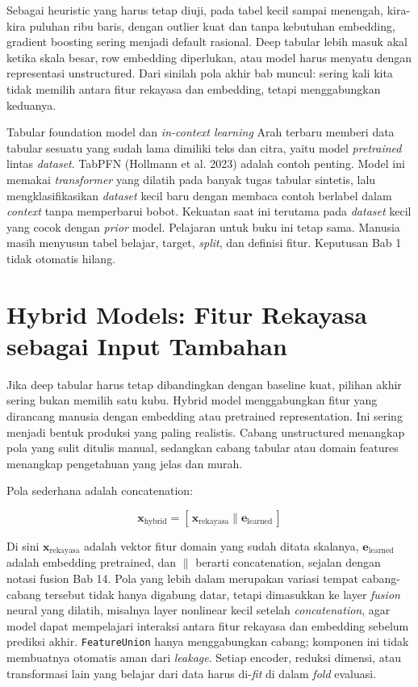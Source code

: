 Sebagai heuristic yang harus tetap diuji, pada tabel kecil sampai menengah, kira-kira puluhan ribu baris, dengan outlier kuat dan tanpa kebutuhan embedding, gradient boosting sering menjadi default rasional. Deep tabular lebih masuk akal ketika skala besar, row embedding diperlukan, atau model harus menyatu dengan representasi unstructured. Dari sinilah pola akhir bab muncul: sering kali kita tidak memilih antara fitur rekayasa dan embedding, tetapi menggabungkan keduanya.

\begin{pendalaman}{Tabular foundation model dan \emph{in-context learning}}
Arah terbaru memberi data tabular sesuatu yang sudah lama dimiliki teks dan citra, yaitu model \emph{pretrained} lintas \emph{dataset}. TabPFN (Hollmann et al. 2023) adalah contoh penting. Model ini memakai \emph{transformer} yang dilatih pada banyak tugas tabular sintetis, lalu mengklasifikasikan \emph{dataset} kecil baru dengan membaca contoh berlabel dalam \emph{context} tanpa memperbarui bobot. Kekuatan saat ini terutama pada \emph{dataset} kecil yang cocok dengan \emph{prior} model. Pelajaran untuk buku ini tetap sama. Manusia masih menyusun tabel belajar, target, \emph{split}, dan definisi fitur. Keputusan Bab 1 tidak otomatis hilang.
\end{pendalaman}

\section{Hybrid Models: Fitur Rekayasa sebagai Input Tambahan}\label{hybrid-models-fitur-rekayasa-sebagai-input-tambahan}

Jika deep tabular harus tetap dibandingkan dengan baseline kuat, pilihan akhir sering bukan memilih satu kubu. Hybrid model menggabungkan fitur yang dirancang manusia dengan embedding atau pretrained representation. Ini sering menjadi bentuk produksi yang paling realistis. Cabang unstructured menangkap pola yang sulit ditulis manual, sedangkan cabang tabular atau domain features menangkap pengetahuan yang jelas dan murah.

Pola sederhana adalah concatenation:

\[
\mathbf{x}_{\text{hybrid}} = [\, \mathbf{x}_{\text{rekayasa}} \parallel \mathbf{e}_{\text{learned}} \,]
\]

Di sini \(\mathbf{x}_{\text{rekayasa}}\) adalah vektor fitur domain yang sudah ditata skalanya, \(\mathbf{e}_{\text{learned}}\) adalah embedding pretrained, dan \(\parallel\) berarti concatenation, sejalan dengan notasi fusion Bab 14. Pola yang lebih dalam merupakan variasi tempat cabang-cabang tersebut tidak hanya digabung datar, tetapi dimasukkan ke layer \emph{fusion} neural yang dilatih, misalnya layer nonlinear kecil setelah \emph{concatenation}, agar model dapat mempelajari interaksi antara fitur rekayasa dan embedding sebelum prediksi akhir. \passthrough{\lstinline!FeatureUnion!} hanya menggabungkan cabang; komponen ini tidak membuatnya otomatis aman dari \emph{leakage}. Setiap encoder, reduksi dimensi, atau transformasi lain yang belajar dari data harus di-\emph{fit} di dalam \emph{fold} evaluasi.

